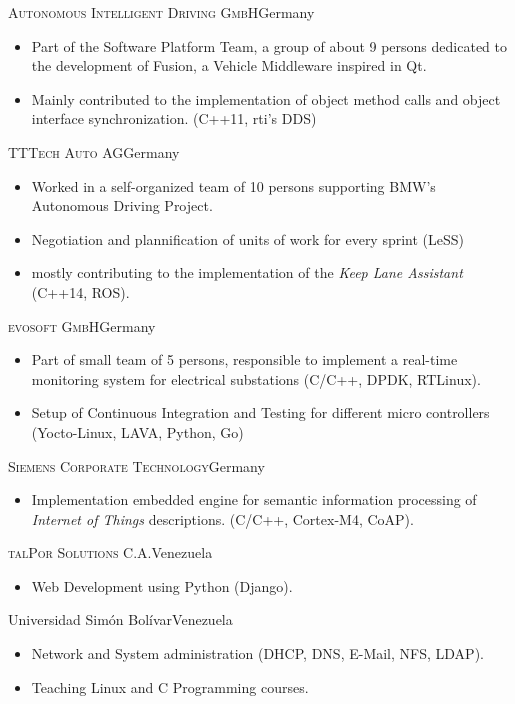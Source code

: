 \documentclass[10pt]{moderncv}
\begin{document}
{\textsc{Autonomous Intelligent Driving GmbH}}{Germany}{}{%
\begin{itemize}
  \item Part of the Software Platform Team, a group of about 9 persons dedicated to the development of Fusion, a Vehicle
      Middleware inspired in Qt.
  \item Mainly contributed to the implementation of object method calls and object interface synchronization. (C++11, rti's DDS)
\end{itemize}
}

{\textsc{TTTech Auto AG}}{Germany}{}{%
\begin{itemize}
  \item Worked in a self-organized team of 10 persons supporting BMW's Autonomous Driving Project.
  \item Negotiation and plannification of units of work for every sprint (LeSS)
  \item mostly contributing to the implementation of the \textit{Keep Lane Assistant} (C++14, ROS).
\end{itemize}
}

{\textsc{evosoft GmbH}}{Germany}{}{%
\begin{itemize}
  \item Part of small team of 5 persons, responsible to implement a real-time monitoring system for electrical substations
      (C/C++, DPDK, RTLinux).
  \item Setup of Continuous Integration and Testing for different micro controllers (Yocto-Linux, LAVA, Python, Go)
\end{itemize}
}

{\textsc{Siemens Corporate Technology}}{Germany}{}{%
\begin{itemize}
  \item Implementation embedded engine for semantic information processing of \textit{Internet of Things} descriptions. (C/C++,
      Cortex-M4, CoAP).
\end{itemize}
}

{\textsc{talPor Solutions C.A.}}{Venezuela}{}{%
\begin{itemize}
  \item Web Development using Python (Django).
\end{itemize}
}

 {Universidad Sim\'{o}n Bol\'{i}var}{Venezuela}{}{%
\begin{itemize}
  \item Network and System administration (DHCP, DNS, E-Mail, NFS, LDAP).
  \item Teaching Linux and C Programming courses.
\end{itemize}
}
\end{document}
